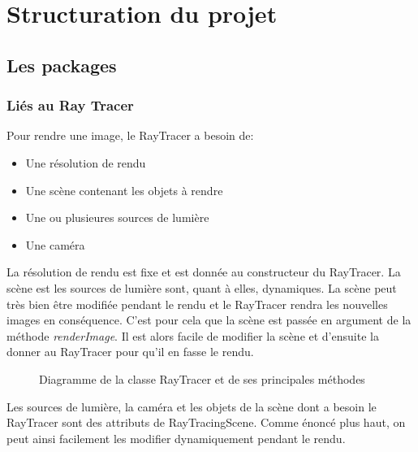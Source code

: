 \documentclass[11pt]{article}
\begin{document}
\section{Structuration du projet}
\subsection{Les packages}
\subsubsection{Liés au Ray Tracer}

Pour rendre une image, le RayTracer a besoin de:
\begin{itemize}
	\item{Une résolution de rendu}
	\item{Une scène contenant les objets à rendre}
	\item{Une ou plusieures sources de lumière}
	\item{Une caméra}
\end{itemize}
La résolution de rendu est fixe et est donnée au constructeur du RayTracer. La scène est les sources de lumière sont, quant à elles, dynamiques. La scène peut très bien être modifiée pendant le rendu et le RayTracer rendra les nouvelles images en conséquence. C'est pour cela que la scène est passée en argument de la méthode \textit{renderImage}. Il est alors facile de modifier la scène et d'ensuite la donner au RayTracer pour qu'il en fasse le rendu.

\begin{figure}[h!]
	
	\caption{Diagramme de la classe RayTracer et de ses principales méthodes}
	\label{diagrammeRayTracer}
\end{figure}
\FloatBarrier

Les sources de lumière, la caméra et les objets de la scène dont a besoin le RayTracer sont des attributs de RayTracingScene. Comme énoncé plus haut, on peut ainsi facilement les modifier dynamiquement pendant le rendu.
\end{document}
